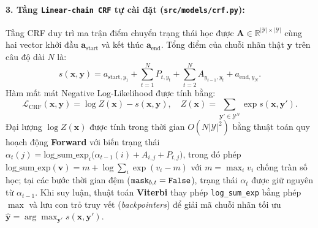 \documentclass[11pt,a4paper,twocolumn]{article}
\begin{document}
\paragraph{3. Tầng \texttt{Linear-chain CRF} tự cài đặt (\texttt{src/models/crf.py}):}
Tầng CRF duy trì ma trận điểm chuyển trạng thái học được $\mathbf{A} \in \mathbb{R}^{|\mathcal{Y}| \times |\mathcal{Y}|}$ cùng hai vector khởi đầu $\mathbf{a}_{\text{start}}$ và kết thúc $\mathbf{a}_{\text{end}}$. Tổng điểm của chuỗi nhãn thật $\mathbf{y}$ trên câu độ dài $N$ là:
\begin{equation}
  s(\mathbf{x}, \mathbf{y}) = a_{\text{start}, y_1} + \sum_{t=1}^{N} P_{t, y_t} + \sum_{t=2}^{N} A_{y_{t-1}, y_t} + a_{\text{end}, y_N}.
\end{equation}
Hàm mất mát Negative Log-Likelihood được tính bằng:
\begin{equation}
  \mathcal{L}_{\text{CRF}}(\mathbf{x}, \mathbf{y}) = \log Z(\mathbf{x}) - s(\mathbf{x}, \mathbf{y}), \quad Z(\mathbf{x}) = \sum_{\mathbf{y}' \in \mathcal{Y}^N} \exp s(\mathbf{x}, \mathbf{y}').
\end{equation}
Đại lượng $\log Z(\mathbf{x})$ được tính trong thời gian $O(N |\mathcal{Y}|^2)$ bằng thuật toán quy hoạch động \textbf{Forward} với biến trạng thái $\alpha_t(j) = \text{log\_sum\_exp}_{i} \big(\alpha_{t-1}(i) + A_{i, j} + P_{t, j}\big)$, trong đó phép $\text{log\_sum\_exp}(\mathbf{v}) = m + \log \sum_i \exp(v_i - m)$ với $m = \max_i v_i$ chống tràn số học; tại các bước thời gian đệm ($\text{\texttt{mask}}_{b,t} = \text{\texttt{False}}$), trạng thái $\alpha_t$ được giữ nguyên từ $\alpha_{t-1}$. Khi suy luận, thuật toán \textbf{Viterbi} thay phép \texttt{log\_sum\_exp} bằng phép $\max$ và lưu con trỏ truy vết (\textit{backpointers}) để giải mã chuỗi nhãn tối ưu $\hat{\mathbf{y}} = \arg\max_{\mathbf{y}'} s(\mathbf{x}, \mathbf{y}')$.
\end{document}
